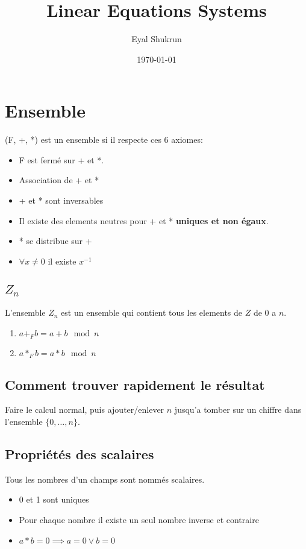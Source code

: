 \documentclass[12pt]{article}
\title{Linear Equations Systems}
\date{\today}
\author{Eyal Shukrun}
\begin{document}
\section{Ensemble}
(F, +, *) est un ensemble si il respecte ces 6 axiomes: \\

\begin{itemize}
  \item F est fermé sur + et *. 
  \item Association de + et *
  \item + et * sont inversables
  \item Il existe des elements neutres pour + et * \textbf{uniques et non égaux}.
  \item * se distribue sur +
  \item $ \forall x \neq 0$ il existe $x^{-1}$
\end{itemize}

\subsection{$Z_n$}
L'ensemble $Z_n$ est un ensemble qui contient tous les elements de $Z$ de 0 a $n$.
\begin{enumerate}
  \item $a +_F b = a+b \mod n$ 
  \item $a *_F b = a*b \mod n$ 
\end{enumerate}

\subsection{Comment trouver rapidement le résultat}
Faire le calcul normal, puis ajouter/enlever $n$ jusqu'a tomber sur un chiffre dans l'ensemble $\{0, \ldots, n\}$.
  
  

\subsection{Propriétés des scalaires}

Tous les nombres d'un champs sont nommés scalaires.  

\begin{itemize}
 \item 0 et 1 sont uniques
 \item Pour chaque nombre il existe un seul nombre inverse et contraire

 \item $a*b = 0 \implies a=0 \lor b=0$
\end{itemize} 
\end{document}
